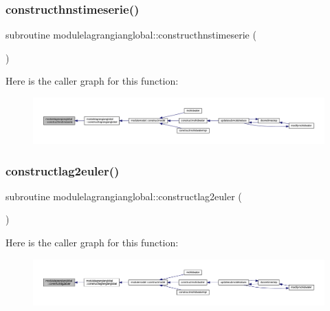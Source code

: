\subsubsection{\texorpdfstring{constructhnstimeserie()}{constructhnstimeserie()}}
{\footnotesize\ttfamily subroutine modulelagrangianglobal\+::constructhnstimeserie (\begin{DoxyParamCaption}{ }\end{DoxyParamCaption})\hspace{0.3cm}{\ttfamily [private]}}

Here is the caller graph for this function\+:\nopagebreak
\begin{figure}[H]
\begin{center}
\leavevmode
\includegraphics[width=350pt]{namespacemodulelagrangianglobal_a56d6b284b701a9103a92e0956ad4cc6a_icgraph}
\end{center}
\end{figure}
\mbox{\label{namespacemodulelagrangianglobal_a5c09d9f8068efed26002854c2ba12362}} 
\subsubsection{\texorpdfstring{constructlag2euler()}{constructlag2euler()}}
{\footnotesize\ttfamily subroutine modulelagrangianglobal\+::constructlag2euler (\begin{DoxyParamCaption}{ }\end{DoxyParamCaption})\hspace{0.3cm}{\ttfamily [private]}}

Here is the caller graph for this function\+:\nopagebreak
\begin{figure}[H]
\begin{center}
\leavevmode
\includegraphics[width=350pt]{namespacemodulelagrangianglobal_a5c09d9f8068efed26002854c2ba12362_icgraph}
\end{center}
\end{figure}
\mbox{\label{namespacemodulelagrangianglobal_a19213baf32d688585211b786d897cd69}} 
